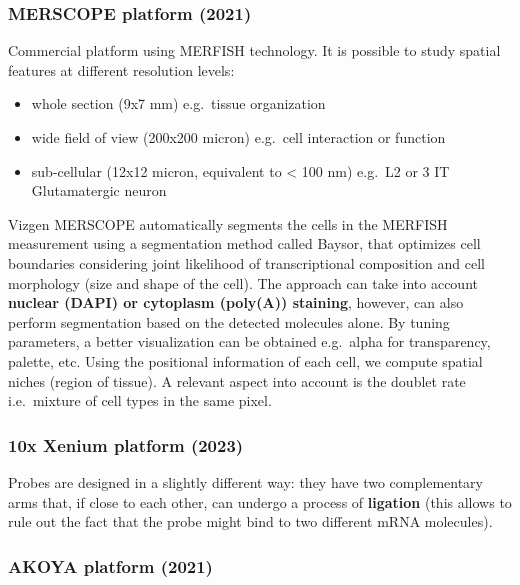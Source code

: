 \hypertarget{merscope-platform-2021}{%
\subsubsection{MERSCOPE platform (2021)}\label{merscope-platform-2021}}

Commercial platform using MERFISH technology. It is possible to study
spatial features at different resolution levels:

\begin{itemize}
\tightlist
\item
  whole section (9x7 mm) e.g.~tissue organization
\item
  wide field of view (200x200 micron) e.g.~cell interaction or function
\item
  sub-cellular (12x12 micron, equivalent to \textless{} 100 nm) e.g.~L2
  or 3 IT Glutamatergic neuron
\end{itemize}

Vizgen MERSCOPE automatically segments the cells in the MERFISH
measurement using a segmentation method called Baysor, that optimizes
cell boundaries considering joint likelihood of transcriptional
composition and cell morphology (size and shape of the cell). The
approach can take into account \textbf{nuclear (DAPI) or cytoplasm
(poly(A)) staining}, however, can also perform segmentation based on the
detected molecules alone. By tuning parameters, a better visualization
can be obtained e.g.~alpha for transparency, palette, etc. Using the
positional information of each cell, we compute spatial niches (region
of tissue). A relevant aspect into account is the doublet rate
i.e.~mixture of cell types in the same pixel.

\hypertarget{x-xenium-platform-2023}{%
\subsubsection{\texorpdfstring{\textbf{10x Xenium platform
(2023)}}{10x Xenium platform (2023)}}\label{x-xenium-platform-2023}}

Probes are designed in a slightly different way: they have two
complementary arms that, if close to each other, can undergo a process
of \textbf{ligation} (this allows to rule out the fact that the probe
might bind to two different mRNA molecules).

\hypertarget{akoya-platform-2021}{%
\subsubsection{AKOYA platform (2021)}\label{akoya-platform-2021}}


